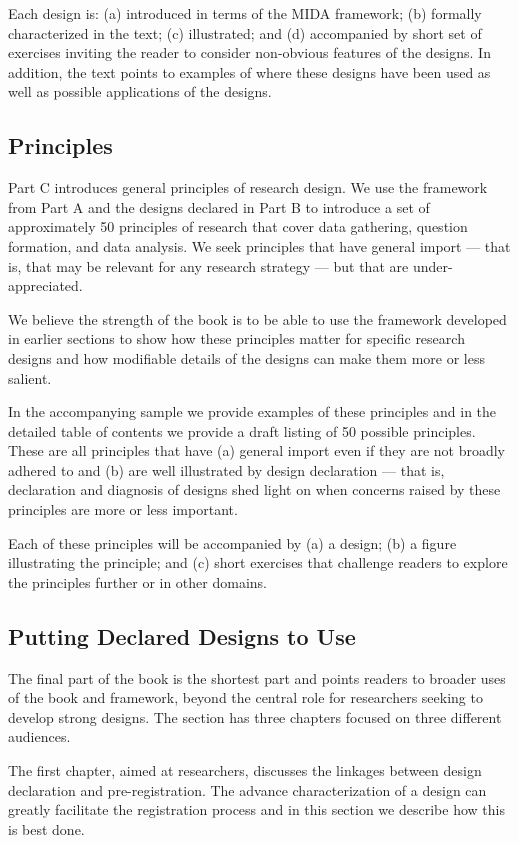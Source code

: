 \documentclass[11pt]{article}
\begin{document}
Each design is: (a) introduced in terms of the MIDA framework; (b) formally characterized in the text; (c) illustrated; and (d) accompanied by short set of exercises inviting the reader to consider non-obvious features of the designs. In addition, the text points to examples of where these designs have been used as well as possible applications of the designs.

\subsection{Principles}

Part C introduces general principles of research design. We use the framework from Part A and the designs declared in Part B to introduce a set of approximately 50 principles of research that cover data gathering, question formation, and data analysis. We seek principles that have general import --- that is, that may be relevant for any research strategy --- but that are under-appreciated.

We believe the strength of the book is to be able to use the framework developed in earlier sections to show how these principles matter for specific research designs and how modifiable details of the designs can make them more or less salient. 

In the accompanying sample we provide examples of these principles and in the detailed table of contents we provide a draft listing of 50 possible principles. These are all principles that have (a) general import even if they are not broadly adhered to and (b) are well illustrated by design declaration --- that is, declaration and diagnosis of designs shed light on when concerns raised by these principles are more or less important.

Each of these principles will be accompanied by (a) a design; (b) a figure illustrating the principle; and (c) short exercises that challenge readers to explore the principles further or in other domains. 

\subsection{Putting Declared Designs to Use}
The final part of the book is the shortest part and points readers to broader uses of the book and framework, beyond the central role for researchers seeking to develop strong designs. The section has three chapters focused on three different audiences.

The first chapter, aimed at researchers, discusses the linkages between design declaration and pre-registration. The advance characterization of a design can greatly facilitate the registration process and in this section we describe how this is best done. 
\end{document}
